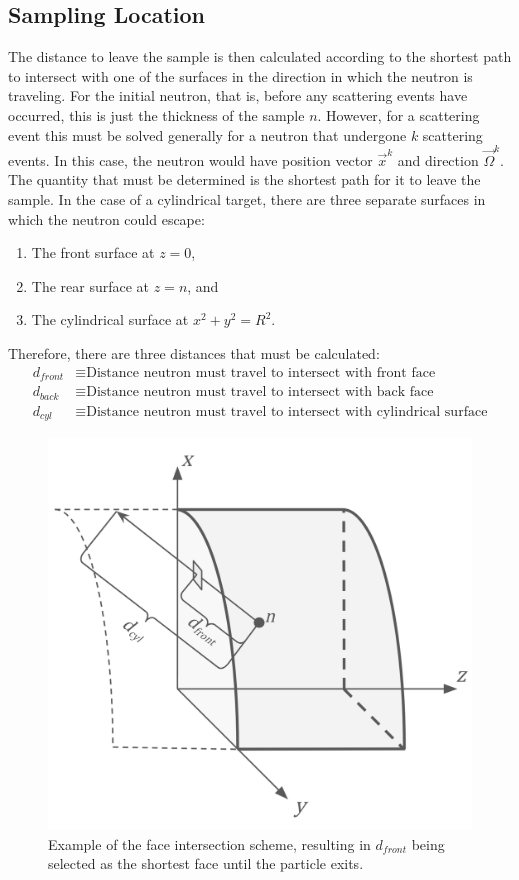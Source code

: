 \subsection{Sampling Location}
\label{ssec:sampling-location-ms}
The distance to leave the sample is then calculated according to the shortest path to intersect with one of the surfaces in the direction in which the neutron is traveling. For the initial neutron, that is, before any scattering events have occurred, this is just the thickness of the sample $n$. However, for a scattering event this must be solved generally for a neutron that undergone $k$ scattering events. In this case, the neutron would have position vector $\overrightarrow{x}^k$ and direction $\overrightarrow{\Omega}^k$. The quantity that must be determined is the shortest path for it to leave the sample. In the case of a cylindrical target, there are three separate surfaces in which the neutron could escape:
\begin{enumerate}
    \item The front surface at $z=0$,
    \item The rear surface at $z=n$, and
    \item The cylindrical surface at $x^2 + y^2 = R^2$.
\end{enumerate}
Therefore, there are three distances that must be calculated:
\begin{align*}
    d_{front}   &\equiv \text{Distance neutron must travel to intersect with front face} \\
    d_{back}    &\equiv \text{Distance neutron must travel to intersect with back face} \\
    d_{cyl}     &\equiv \text{Distance neutron must travel to intersect with cylindrical surface}
\end{align*}
\begin{figure}[h]
    \centering
    \includegraphics[width=0.75\linewidth]{Capture Yield/Figures/ms_face_intersection.png}
    \caption{Example of the face intersection scheme, resulting in $d_{front}$ being selected as the shortest face until the particle exits.}
    \label{fig:ms-face-intersection}
\end{figure}
